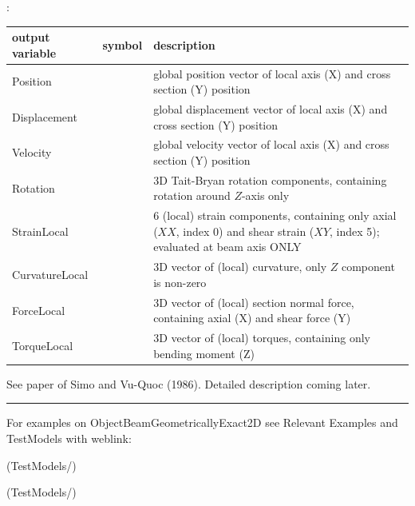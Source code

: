 :
\begin{center}
\footnotesize
\begin{longtable}{| p{5cm} | p{5cm} | p{6cm} |} 
\hline
\bf output variable & \bf symbol & \bf description \\ \hline
Position &  & global position vector of local axis (X) and cross section (Y) position\\ \hline
Displacement &  & global displacement vector of local axis (X) and cross section (Y) position\\ \hline
Velocity &  & global velocity vector of local axis (X) and cross section (Y) position\\ \hline
Rotation &  & 3D Tait-Bryan rotation components, containing rotation around $Z$-axis only\\ \hline
StrainLocal &  & 6 (local) strain components, containing only axial ($XX$, index 0) and shear strain ($XY$, index 5); evaluated at beam axis ONLY\\ \hline
CurvatureLocal &  & 3D vector of (local) curvature, only $Z$ component is non-zero\\ \hline
ForceLocal &  & 3D vector of (local) section normal force, containing axial (X) and shear force (Y)\\ \hline
TorqueLocal &  & 3D vector of (local) torques, containing only bending moment (Z)\\ \hline
\end{longtable}
\end{center}
 \noindent
    See paper of Simo and Vu-Quoc (1986).
    Detailed description coming later.
\vspace{6pt}\par\noindent\rule{\textwidth}{0.4pt}
%
\noindent For examples on ObjectBeamGeometricallyExact2D see Relevant Examples and TestModels with weblink:
\bi
\item {} (TestModels/)
\item {} (TestModels/)

\ei

%
\newpage


